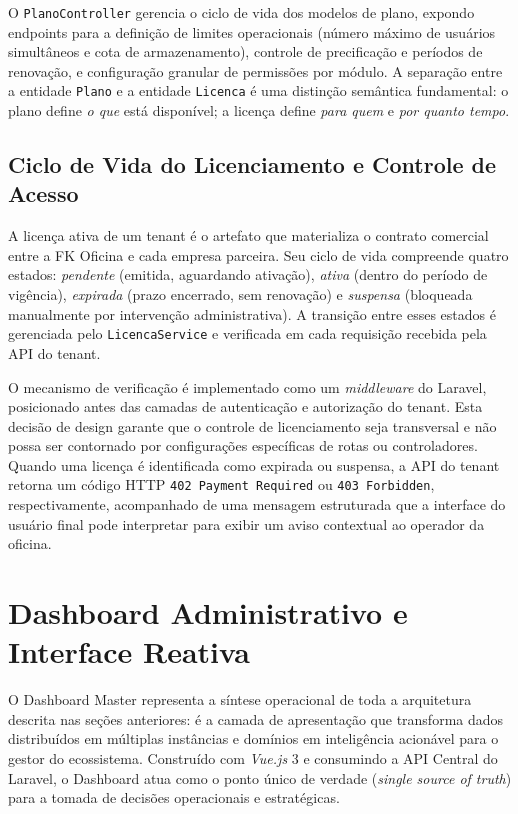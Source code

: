 O \texttt{PlanoController} gerencia o ciclo de vida dos modelos de plano,
expondo endpoints para a definição de limites operacionais (número máximo de
usuários simultâneos e cota de armazenamento), controle de precificação e
períodos de renovação, e configuração granular de permissões por módulo.
A separação entre a entidade \texttt{Plano} e a entidade \texttt{Licenca}
é uma distinção semântica fundamental: o plano define \textit{o que} está
disponível; a licença define \textit{para quem} e \textit{por quanto tempo}.

\subsection{Ciclo de Vida do Licenciamento e Controle de Acesso}

A licença ativa de um tenant é o artefato que materializa o contrato comercial
entre a FK Oficina e cada empresa parceira. Seu ciclo de vida compreende quatro
estados: \textit{pendente} (emitida, aguardando ativação), \textit{ativa}
(dentro do período de vigência), \textit{expirada} (prazo encerrado, sem
renovação) e \textit{suspensa} (bloqueada manualmente por intervenção
administrativa). A transição entre esses estados é gerenciada pelo
\texttt{LicencaService} e verificada em cada requisição recebida pela API
do tenant.

O mecanismo de verificação é implementado como um \textit{middleware} do
Laravel, posicionado antes das camadas de autenticação e autorização do tenant.
Esta decisão de design garante que o controle de licenciamento seja
transversal e não possa ser contornado por configurações específicas de rotas
ou controladores. Quando uma licença é identificada como expirada ou suspensa,
a API do tenant retorna um código HTTP \texttt{402 Payment Required} ou
\texttt{403 Forbidden}, respectivamente, acompanhado de uma mensagem estruturada
que a interface do usuário final pode interpretar para exibir um aviso
contextual ao operador da oficina.


\section{Dashboard Administrativo e Interface Reativa}

O Dashboard Master representa a síntese operacional de toda a arquitetura
descrita nas seções anteriores: é a camada de apresentação que transforma dados
distribuídos em múltiplas instâncias e domínios em inteligência acionável para
o gestor do ecossistema. Construído com \textit{Vue.js} 3 e consumindo a API
Central do Laravel, o Dashboard atua como o ponto único de verdade (\textit{single
source of truth}) para a tomada de decisões operacionais e estratégicas.

